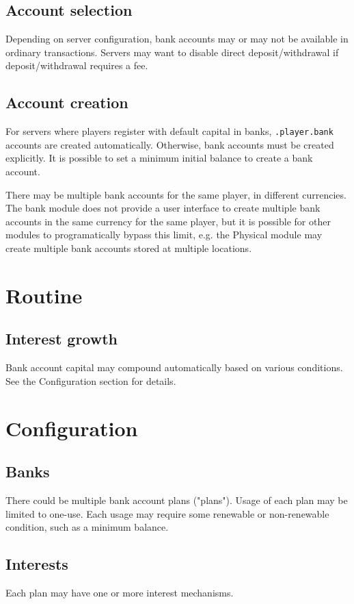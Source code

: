 \documentclass{report}
\begin{document}
			\subsection{Account selection}
				Depending on server configuration, bank accounts may or may not be available in ordinary transactions.
				Servers may want to disable direct deposit/withdrawal if deposit/withdrawal requires a fee.

			\subsection{Account creation}
				For servers where players register with default capital in banks,
				\texttt{.player.bank} accounts are created automatically.
				Otherwise, bank accounts must be created explicitly.
				It is possible to set a minimum initial balance to create a bank account.

				There may be multiple bank accounts for the same player, in different currencies.
				The bank module does not provide a user interface to create
				multiple bank accounts in the same currency for the same player,
				but it is possible for other modules to programatically bypass this limit,
				e.g. the Physical module may create multiple bank accounts stored at multiple locations.

		\section{Routine}
			\subsection{Interest growth}
				Bank account capital may compound automatically based on various conditions. See the Configuration section for details.

		\section{Configuration}
			\subsection{Banks}
				There could be multiple bank account plans ("plans").
				Usage of each plan may be limited to one-use.
				Each usage may require some renewable or non-renewable condition, such as a minimum balance.

			\subsection{Interests}
				Each plan may have one or more interest mechanisms.
\end{document}
